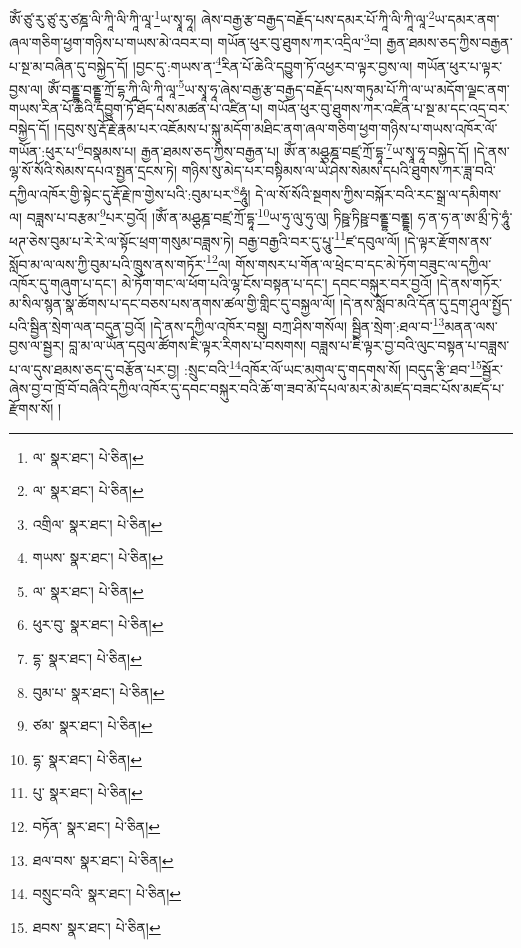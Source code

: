 ཨོཾ་ཙུ་རུ་ཙུ་རུ་ཙཎྜ་ལི་ཀཱི་ལི་ཀཱི་ལཱ་\footnote{ལ་  སྣར་ཐང་།  པེ་ཅིན། }ཡ་སྭཱ་ཧཱ། ཞེས་བརྒྱ་རྩ་བརྒྱད་བརྗོད་པས་དམར་པོ་ཀཱི་ལི་ཀཱི་ལཱ་\footnote{ལ་  སྣར་ཐང་།  པེ་ཅིན། }ཡ་དམར་ནག་ཞལ་གཅིག་ཕྱག་གཉིས་པ་གཡས་མེ་འབར་བ། གཡོན་ཕུར་བུ་ཐུགས་ཀར་འདྲིལ་\footnote{འགྲིལ་  སྣར་ཐང་།  པེ་ཅིན། }བ། རྒྱན་ཐམས་ཅད་ཀྱིས་བརྒྱན་པ་སྔ་མ་བཞིན་དུ་བསྐྱེད་དོ། །བྱང་དུ་:གཡས་ན་\footnote{གཡས་  སྣར་ཐང་།  པེ་ཅིན། }རིན་པོ་ཆེའི་དབྱུག་ཏོ་འཕྱར་བ་ལྟར་བྱས་ལ། གཡོན་ཕུར་པ་ལྟར་བྱས་ལ། ཨོཾ་བནྡྷ་བནྡྷ་ཀྲོ་དྷ་ཀཱི་ལི་ཀཱི་ལཱ་\footnote{ལ་  སྣར་ཐང་།  པེ་ཅིན། }ཡ་སྭཱ་ཧཱ་ཞེས་བརྒྱ་རྩ་བརྒྱད་བརྗོད་པས་གཏུམ་པོ་ཀཱི་ལ་ཡ་མདོག་ལྗང་ནག་གཡས་རིན་པོ་ཆེའི་དབྱུག་ཏོ་ཐོད་པས་མཚན་པ་འཛིན་པ། གཡོན་ཕུར་བུ་ཐུགས་ཀར་འཛིན་པ་སྔ་མ་དང་འདྲ་བར་བསྐྱེད་དོ། །དབུས་སུ་རྡོ་རྗེ་རྣམ་པར་འཇོམས་པ་སྐུ་མདོག་མཐིང་ནག་ཞལ་གཅིག་ཕྱག་གཉིས་པ་གཡས་འཁོར་ལོ་གཡོན་:ཕུར་པ་\footnote{ཕུར་བུ་  སྣར་ཐང་།  པེ་ཅིན། }བསྣམས་པ། རྒྱན་ཐམས་ཅད་ཀྱིས་བརྒྱན་པ། ཨོཾ་ན་མཤྩཎྜ་བཛྲ་ཀྲོ་དྷཱ་\footnote{དྷ་  སྣར་ཐང་།  པེ་ཅིན། }ཡ་སྭཱ་ཧཱ་བསྐྱེད་དོ། །དེ་ནས་ལྷ་སོ་སོའི་སེམས་དཔའ་སྤྱན་དྲངས་ཏེ། གཉིས་སུ་མེད་པར་བསྟིམས་ལ་ཡེ་ཤེས་སེམས་དཔའི་ཐུགས་ཀར་ཟླ་བའི་དཀྱིལ་འཁོར་གྱི་སྟེང་དུ་རྡོ་རྗེ་ཁ་གྱེས་པའི་:བུམ་པར་\footnote{བུམ་པ་  སྣར་ཐང་།  པེ་ཅིན། }ཧཱུཾ། དེ་ལ་སོ་སོའི་སྔགས་ཀྱིས་བསྐོར་བའི་རང་སྒྲ་ལ་དམིགས་ལ། བཟླས་པ་བརྩམ་\footnote{ཙམ་  སྣར་ཐང་།  པེ་ཅིན། }པར་བྱའོ། །ཨོཾ་ན་མཤྩཎྜ་བཛྲ་ཀྲོ་དྷཱ་\footnote{དྷ་  སྣར་ཐང་།  པེ་ཅིན། }ཡ་ཧུ་ལུ་ཧུ་ལུ། ཏིཥྛ་ཏིཥྛ་བནྡྷ་བནྡྷ། ཧ་ན་ཧ་ན་ཨ་མྲྀ་ཏེ་ཧཱུཾ་ཕཊ་ཅེས་བུམ་པ་རེ་རེ་ལ་སྟོང་ཕྲག་གསུམ་བཟླས་ཏེ། བརྒྱ་བརྒྱའི་བར་དུ་པཱུ་\footnote{པུ་  སྣར་ཐང་།  པེ་ཅིན། }ཛ་དབུལ་ལོ། །དེ་ལྟར་རྫོགས་ནས་སློབ་མ་ལ་ལས་ཀྱི་བུམ་པའི་ཁྲུས་ནས་གཏོར་\footnote{བཏོན་  སྣར་ཐང་།  པེ་ཅིན། }ལ། གོས་གསར་པ་གོན་ལ་ཕྲེང་བ་དང་མེ་ཏོག་བཟུང་ལ་དཀྱིལ་འཁོར་དུ་གཞུག་པ་དང་། མེ་ཏོག་གང་ལ་ཕོག་པའི་ལྷ་ངོས་བསྟན་པ་དང་། དབང་བསྐུར་བར་བྱའོ། །དེ་ནས་གཏོར་མ་སིལ་སྙན་སྣ་ཚོགས་པ་དང་བཅས་པས་ནགས་ཚལ་གྱི་གླིང་དུ་བསྐྱལ་ལོ། །དེ་ནས་སློབ་མའི་དོན་དུ་དྲག་ཤུལ་སྤྱོད་པའི་སྦྱིན་སྲེག་ལན་བདུན་བྱའོ། །དེ་ནས་དཀྱིལ་འཁོར་བསྡུ། བཀྲ་ཤིས་གསོལ། སྦྱིན་སྲེག་:ཐལ་བ་\footnote{ཐལ་བས་  སྣར་ཐང་།  པེ་ཅིན། }མནན་ལས་བྱས་ལ་སྦྱར། བླ་མ་ལ་ཡོན་དབུལ་ཚོགས་ཇི་ལྟར་རིགས་པ་བསགས། བཟླས་པ་ཇི་ལྟར་བྱ་བའི་ལུང་བསྟན་པ་བཟླས་པ་ལ་དུས་ཐམས་ཅད་དུ་བརྩོན་པར་བྱ། :སྲུང་བའི་\footnote{བསྲུང་བའི་  སྣར་ཐང་།  པེ་ཅིན། }འཁོར་ལོ་ཡང་མགུལ་དུ་གདགས་སོ། །བདུད་རྩི་ཐབ་\footnote{ཐབས་  སྣར་ཐང་།  པེ་ཅིན། }སྦྱོར་ཞེས་བྱ་བ་ཁྲོ་བོ་བཞིའི་དཀྱིལ་འཁོར་དུ་དབང་བསྐུར་བའི་ཆོ་ག་ཟབ་མོ་དཔལ་མར་མེ་མཛད་བཟང་པོས་མཛད་པ་རྫོགས་སོ། ། 